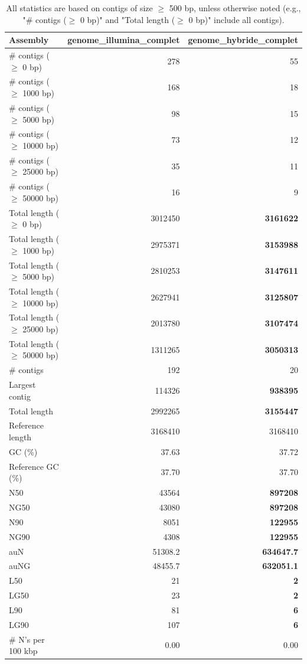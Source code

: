 \documentclass[12pt,a4paper]{article}
\begin{document}
\begin{table}[ht]
\begin{center}
\caption{All statistics are based on contigs of size $\geq$ 500 bp, unless otherwise noted (e.g., "\# contigs ($\geq$ 0 bp)" and "Total length ($\geq$ 0 bp)" include all contigs).}
\begin{tabular}{|l*{2}{|r}|}
\hline
Assembly & genome\_illumina\_complet & genome\_hybride\_complet \\ \hline
\# contigs ($\geq$ 0 bp) & 278 & 55 \\ \hline
\# contigs ($\geq$ 1000 bp) & 168 & 18 \\ \hline
\# contigs ($\geq$ 5000 bp) & 98 & 15 \\ \hline
\# contigs ($\geq$ 10000 bp) & 73 & 12 \\ \hline
\# contigs ($\geq$ 25000 bp) & 35 & 11 \\ \hline
\# contigs ($\geq$ 50000 bp) & 16 & 9 \\ \hline
Total length ($\geq$ 0 bp) & 3012450 & {\bf 3161622} \\ \hline
Total length ($\geq$ 1000 bp) & 2975371 & {\bf 3153988} \\ \hline
Total length ($\geq$ 5000 bp) & 2810253 & {\bf 3147611} \\ \hline
Total length ($\geq$ 10000 bp) & 2627941 & {\bf 3125807} \\ \hline
Total length ($\geq$ 25000 bp) & 2013780 & {\bf 3107474} \\ \hline
Total length ($\geq$ 50000 bp) & 1311265 & {\bf 3050313} \\ \hline
\# contigs & 192 & 20 \\ \hline
Largest contig & 114326 & {\bf 938395} \\ \hline
Total length & 2992265 & {\bf 3155447} \\ \hline
Reference length & 3168410 & 3168410 \\ \hline
GC (\%) & 37.63 & 37.72 \\ \hline
Reference GC (\%) & 37.70 & 37.70 \\ \hline
N50 & 43564 & {\bf 897208} \\ \hline
NG50 & 43080 & {\bf 897208} \\ \hline
N90 & 8051 & {\bf 122955} \\ \hline
NG90 & 4308 & {\bf 122955} \\ \hline
auN & 51308.2 & {\bf 634647.7} \\ \hline
auNG & 48455.7 & {\bf 632051.1} \\ \hline
L50 & 21 & {\bf 2} \\ \hline
LG50 & 23 & {\bf 2} \\ \hline
L90 & 81 & {\bf 6} \\ \hline
LG90 & 107 & {\bf 6} \\ \hline
\# N's per 100 kbp & 0.00 & 0.00 \\ \hline
\end{tabular}
\end{center}
\end{table}
\end{document}

